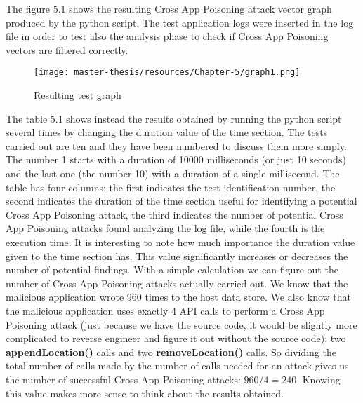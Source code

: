 \documentclass[a4paper,10pt]{memoir}
\begin{document}
The figure 5.1 shows the resulting Cross App Poisoning attack vector graph produced by the python script. The test application logs were inserted in the log file in order to test also the analysis phase to check if Cross App Poisoning vectors are filtered correctly.
\begin{figure}[h]
\caption{Resulting test graph}
\label{fig:graphtest}
\texttt{[image: master-thesis/resources/Chapter-5/graph1.png]}
\centering
\end{figure}
The table 5.1 shows instead the results obtained by running the python script several times by changing the duration value of the time section. The tests carried out are ten and they have been numbered to discuss them more simply. The number 1 starts with a duration of 10000 milliseconds (or just 10 seconds) and the last one (the number 10) with a duration of a single millisecond. The table has four columns: the first indicates the test identification number, the second indicates the duration of the time section useful for identifying a potential Cross App Poisoning attack, the third indicates the number of potential Cross App Poisoning attacks found analyzing the log file, while the fourth is the execution time. It is interesting to note how much importance the duration value given to the time section has. This value significantly increases or decreases the number of potential findings. With a simple calculation we can figure out the number of Cross App Poisoning attacks actually carried out. We know that the malicious application wrote 960 times to the host data store. We also know that the malicious application uses exactly 4 API calls to perform a Cross App Poisoning attack (just because we have the source code, it would be slightly more complicated to reverse engineer and figure it out without the source code): two \textbf{appendLocation()} calls and two \textbf{removeLocation()} calls. So dividing the total number of calls made by the number of calls needed for an attack gives us the number of successful Cross App Poisoning attacks: $960 / 4 = 240$. Knowing this value makes more sense to think about the results obtained.
\end{document}

